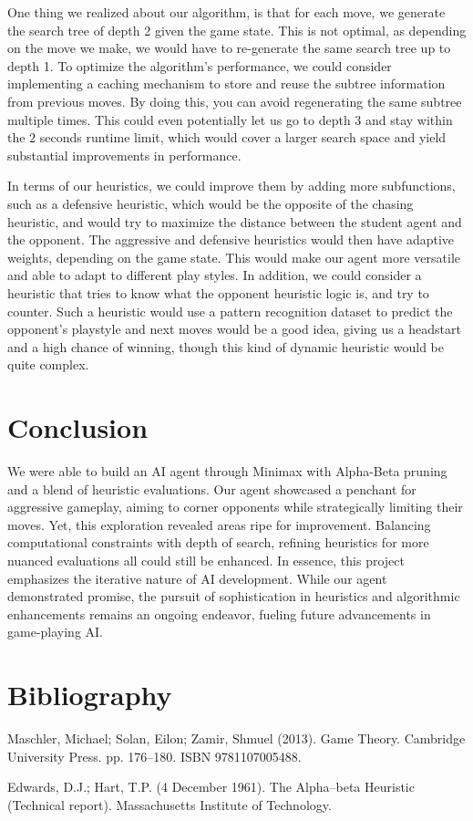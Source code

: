 \documentclass[11pt]{article}
\begin{document}
One thing we realized about our algorithm, is that for each move, we generate the search tree of depth 2 given the game state. This is not optimal, as depending on the move we make, we would have to re-generate the same search tree up to depth 1.
To optimize the algorithm's performance, we could consider implementing a caching mechanism to store and reuse the subtree information from previous moves. By doing this, you can avoid regenerating the same subtree multiple times.
This could even potentially let us go to depth 3 and stay within the $2$ seconds runtime limit, which would cover a larger search space and yield substantial improvements in performance.

In terms of our heuristics, we could improve them by adding more subfunctions, such as a defensive heuristic, which would be the opposite of the chasing heuristic, and would try to maximize the distance between the student agent and the opponent. The aggressive and defensive heuristics
would then have adaptive weights, depending on the game state. This would make our agent more versatile and able to adapt to different play styles. 
In addition, we could consider a heuristic that tries to know what the opponent heuristic logic is, and try to counter. Such a heuristic would use 
a pattern recognition dataset to predict the opponent's playstyle and next moves would be a good idea, giving us a headstart and a high chance of winning, though this kind of dynamic heuristic would be quite complex.

\section{Conclusion}

We were able to build an AI agent through Minimax with Alpha-Beta pruning and a blend of heuristic evaluations. Our agent showcased a penchant for aggressive gameplay, aiming to corner opponents while strategically limiting their moves.
Yet, this exploration revealed areas ripe for improvement. Balancing computational constraints with depth of search, refining heuristics for more nuanced evaluations all could still be enhanced.
In essence, this project emphasizes the iterative nature of AI development. While our agent demonstrated promise, the pursuit of sophistication in heuristics and algorithmic enhancements remains 
an ongoing endeavor, fueling future advancements in game-playing AI.





\pagebreak
\section*{Bibliography}

\begin{flushleft}
    Maschler, Michael; Solan, Eilon; Zamir, Shmuel (2013). Game Theory. Cambridge University Press. pp. 176–180. ISBN 9781107005488.
\end{flushleft}

\begin{flushleft}
    Edwards, D.J.; Hart, T.P. (4 December 1961). The Alpha–beta Heuristic (Technical report). Massachusetts Institute of Technology.
\end{flushleft}
\end{document}
